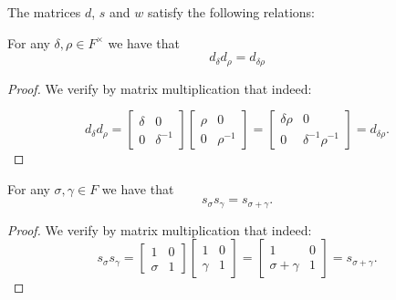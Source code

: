 The matrices $d$, $s$ and $w$ satisfy the following relations:


\begin{lemma}
\label{SpecialMatrices.d_mul_d_eq_d_mul}
\leanok
For any $\delta, \rho \in F^\times$ we have that
\[
d_\delta d_\rho = d_{\delta\rho}
\]
\end{lemma}
\begin{proof}
    We verify by matrix multiplication that indeed:

    \begin{equation*}
        d_\delta d_\rho = \begin{bmatrix} \delta & 0 \\ 0 & \delta^{-1} \end{bmatrix} \begin{bmatrix} \rho & 0 \\ 0 & \rho^{-1} \end{bmatrix} = \begin{bmatrix} \delta \rho & 0 \\ 0 & \delta^{-1} \rho^{-1} \end{bmatrix} = d_{\delta \rho}.
    \end{equation*}
\end{proof}

\begin{lemma}
\label{SpecialMatrices.s_mul_s_eq_s_add}
\leanok
    For any $\sigma, \gamma \in F$ we have that
    \[
    s_\sigma s_\gamma = s_{\sigma + \gamma}.
    \]
\end{lemma}
\begin{proof}
    We verify by matrix multiplication that indeed:
\begin{equation*}
    s_\sigma s_\gamma = \begin{bmatrix} 1 & 0 \\ \sigma & 1 \end{bmatrix} \begin{bmatrix} 1 & 0 \\ \gamma & 1 \end{bmatrix} = \begin{bmatrix} 1 & 0 \\ \sigma + \gamma & 1 \end{bmatrix} = s_{\sigma + \gamma}.
\end{equation*}
\end{proof}

